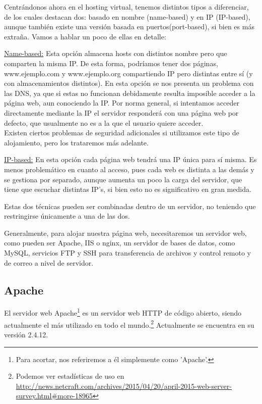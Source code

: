 \documentclass[a4paper, 10pt]{article} %
\begin{document}
Centrándonos ahora en el hosting virtual, tenemos distintos tipos a diferenciar, de los cuales destacan dos: basado en nombre (name-based) y en IP (IP-based), aunque también existe una versión basada en puertos(port-based), si bien es más extraña. Vamos a hablar un poco de ellas en detalle: 

\underline{Name-based:} Esta opción almacena hosts con distintos nombre pero que comparten la misma IP. De esta forma, podríamos tener dos páginas, www.ejemplo.com y www.ejemplo.org compartiendo IP pero distintas entre sí (y con almacenamientos distintos). En esta opción se nos presenta un problema con las DNS, ya que si estas no funcionan debidamente resulta imposible acceder a la página web, aun conociendo la IP. Por norma general, si intentamos acceder directamente mediante la IP el servidor responderá con una página web por defecto, que usualmente no es a la que el usuario quiere acceder. \\
Existen ciertos problemas de seguridad adicionales si utilizamos este tipo de alojamiento, pero los trataremos más adelante. 

\underline{IP-based:} En esta opción cada página web tendrá una IP única para sí misma. Es menos problemático en cuanto al acceso, pues cada web es distinta a las demás y se gestiona por separado, aunque aumenta un poco la carga del servidor, que tiene que escuchar distintas IP's, si bien esto no es significativo en gran medida. 

Estas dos técnicas pueden ser combinadas dentro de un servidor, no teniendo que restringirse únicamente a una de las dos. 

Generalmente, para alojar nuestra página web, necesitaremos un servidor web, como pueden ser Apache, IIS o nginx, un servidor de bases de datos, como MySQL, servicios FTP y SSH para transferencia de archivos y control remoto y de correo a nivel de servidor. 

\subsection{Apache}

El servidor web Apache\footnote{Para acortar, nos referiremos a él simplemente como 'Apache'.} es un servidor web HTTP de código abierto, siendo actualmente el más utilizado en todo el mundo.\footnote{Podemos ver estadísticas de uso en \url{http://news.netcraft.com/archives/2015/04/20/april-2015-web-server-survey.html\#more-18965}} Actualmente se encuentra en su versión 2.4.12. 
\end{document}

